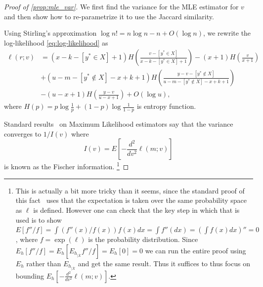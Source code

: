 \begin{proof}[Proof of \cref{prop:mle_var}]
   We first find the variance for the MLE estimator for $v$ and then show how to re-parametrize it to use the Jaccard similarity.

   Using Stirling's approximation $ \log n! = n\log n - n + O(\log n)$,
   we rewrite the log-likelihood \cref{eq:log-likelihood} as
   \begin{align}
      \ell(r;v) &=
      (x-k-[y^*\in X]+1)H(\tfrac{v-[y^*\in X]}{x-k-[y^*\in X]+1})
               - (x+1) H(\tfrac{v}{x+1})
              \\&+(u-m-[y^*\not\in X]-x+k+1) H(\tfrac{y-v-[y^*\not\in X]}{u-m-[y^*\not\in X]-x+k+1})
              \\& -(u-x+1) H(\tfrac{y-v}{u-x+1})
   + O(\log u),
   \end{align}
   where $H(p)=p \log \frac{1}{p} + (1-p)\log \frac{1}{1-p}$ is entropy function.

   Standard results~\cite{panchenko2016lec3} on Maximum Likelihood estimators say that
   the variance converges to $1/I(v)$ where
   \[
      I(v) = E\left[-\frac{d^2}{dv^2}\ell(m;v)\right]
   \]
   is known as the Fischer information.
   \footnote{This is actually a bit more tricky than it seems, since
      the standard proof of this fact~\cite{panchenko2016lec3} uses that the expectation is taken over the same probability space as $\ell$ is defined.
      However one can check that the key step in which that is used is to show
      $E[f''/f] = \int (f''(x)/f(x))f(x)dx = \int f''(dx) = (\int f(x)dx)'' = 0$, where $f=\exp(\ell)$ is the probability distribution.
      Since $E_h[f''/f] = E_h[E_{h_{|\overline X}}f''/f] = E_h[0]= 0$
      we can run the entire proof using $E_h$ rather than $E_{h_{|\overline X}}$ and get the same result.
      Thus it suffices to thus focus on bounding $E_h[-\frac{d^2}{dv^2}\ell(m;v)]$.
   }



\end{proof}
